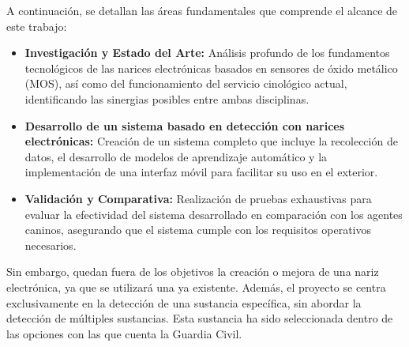 A continuación, se detallan las áreas fundamentales que comprende el alcance de este trabajo:

\begin{itemize}
    \item \textbf{Investigación y Estado del Arte:} Análisis profundo de los fundamentos tecnológicos de las narices electrónicas basados en sensores de óxido metálico (MOS), así como del funcionamiento del servicio cinológico actual, identificando las sinergias posibles entre ambas disciplinas.
    \item \textbf{Desarrollo de un sistema basado en detección con narices electrónicas:} Creación de un sistema completo que incluye la recolección de datos, el desarrollo de modelos de aprendizaje automático y la implementación de una interfaz móvil para facilitar su uso en el exterior.
    \item \textbf{Validación y Comparativa:} Realización de pruebas exhaustivas para evaluar la efectividad del sistema desarrollado en comparación con los agentes caninos, asegurando que el sistema cumple con los requisitos operativos necesarios.
\end{itemize}

Sin embargo, quedan fuera de los objetivos la creación o mejora de una nariz electrónica, ya que se utilizará una ya existente. Además, el proyecto se centra exclusivamente en la detección de una sustancia específica, sin abordar la detección de múltiples sustancias. Esta sustancia ha sido seleccionada dentro de las opciones con las que cuenta la Guardia Civil.